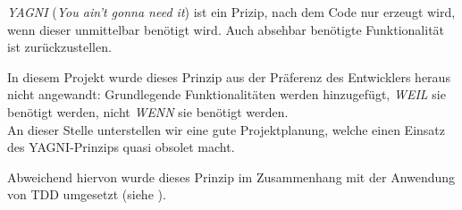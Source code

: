 \textit{YAGNI} (\textit{You ain't gonna need it}) ist ein Prizip, nach dem Code nur erzeugt wird, wenn dieser unmittelbar benötigt wird. Auch absehbar benötigte Funktionalität ist zurückzustellen.

In diesem Projekt wurde dieses Prinzip aus der Präferenz des Entwicklers heraus nicht angewandt: Grundlegende Funktionalitäten werden hinzugefügt, \textit{WEIL} sie benötigt werden, nicht \textit{WENN} sie benötigt werden.\\
An dieser Stelle unterstellen wir eine gute Projektplanung, welche einen Einsatz des YAGNI-Prinzips quasi obsolet macht.

Abweichend hiervon wurde dieses Prinzip im Zusammenhang mit der Anwendung von TDD umgesetzt (siehe ).


